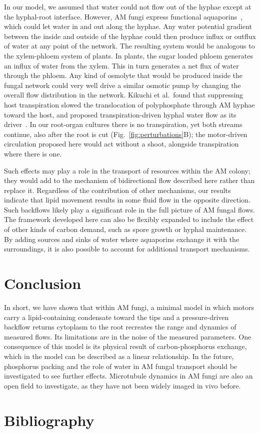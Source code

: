In our model, we assumed that water could not flow out of the hyphae except at the hyphal-root interface.
However, AM fungi express functional aquaporins~\cite{li_first_2013,kikuchi_aquaporin-mediated_2016}, which could let water in and out along the hyphae.
Any water potential gradient between the inside and outside of the hyphae could then produce influx or outflux of water at any point of the network.
The resulting system would be analogous to the xylem-phloem system of plants.
In plants, the sugar loaded phloem generates an influx of water from the xylem.
This in turn generates a net flux of water through the phloem.
Any kind of osmolyte that would be produced inside the fungal network could very well drive a similar osmotic pump by changing the overall flow distribution in the network.
Kikuchi et al.\ found that suppressing host transpiration slowed the translocation of polyphosphate through AM hyphae toward the host, and proposed transpiration-driven hyphal water flow as its driver~\cite{kikuchi_aquaporin-mediated_2016}.
In our root-organ cultures there is no transpiration, yet both streams continue, also after the root is cut (Fig.~\ref{fig:perturbations}B); the motor-driven circulation proposed here would act without a shoot, alongside transpiration where there is one.

Such effects may play a role in the transport of resources within the AM colony; they would add to the mechanism of bidirectional flow described here rather than replace it.
Regardless of the contribution of other mechanisms, our results indicate that lipid movement results in some fluid flow in the opposite direction.
Such backflows likely play a significant role in the full picture of AM fungal flows.
The framework developed here can also be flexibly expanded to include the effect of other kinds of carbon demand, such as spore growth or hyphal maintenance.
By adding sources and sinks of water where aquaporins exchange it with the surroundings, it is also possible to account for additional transport mechanisms.

\section*{Conclusion}
In short, we have shown that within AM fungi, a minimal model in which motors carry a lipid-containing condensate toward the tips and a pressure-driven backflow returns cytoplasm to the root recreates the range and dynamics of measured flows. Its limitations are in the noise of the measured parameters. One consequence of this model is its physical result of carbon-phosphorus exchange, which in the model can be described as a linear relationship. In the future, phosphorus packing and the role of water in AM fungal transport should be investigated to see further effects. Microtubule dynamics in AM fungi are also an open field to investigate, as they have not been widely imaged in vivo before. 

\section*{Bibliography}

